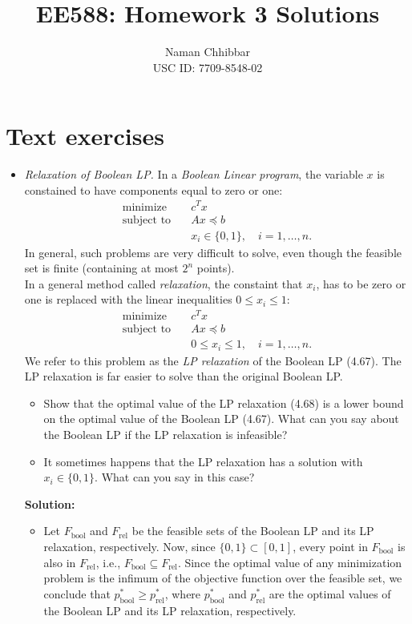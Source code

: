 \documentclass{article}
\title{EE588: Homework 3 Solutions}
\author{
  Naman Chhibbar \\
  USC ID: 7709-8548-02
}
\date{}
\begin{document}
\maketitle

\section{Text exercises}

\begin{itemize}
  \item[4.15] \textit{Relaxation of Boolean LP.} In a \textit{Boolean Linear program}, the variable $x$ is constained to have components equal to zero or one:
  \begin{align*}
    \text{minimize} \quad & c^T x \\
    \text{subject to} \quad & Ax \preceq b \tag{4.67} \\
    & x_i \in \{0, 1\}, \quad i = 1, \ldots, n.
  \end{align*}
  In general, such problems are very difficult to solve, even though the feasible set is finite (containing at most $2^n$ points). \\
  In a general method called \textit{relaxation}, the constaint that $x_i$, has to be zero or one is replaced with the linear inequalities $0 \le x_i \le 1$:
  \begin{align*}
    \text{minimize} \quad & c^T x \\
    \text{subject to} \quad & Ax \preceq b \tag{4.68} \\
    & 0 \le x_i \le 1, \quad i = 1, \ldots, n.
  \end{align*}
  We refer to this problem as the \textit{LP relaxation} of the Boolean LP (4.67). The LP relaxation is far easier to solve than the original Boolean LP.
  \begin{itemize}
    \item[(a)] Show that the optimal value of the LP relaxation (4.68) is a lower bound on the optimal value of the Boolean LP (4.67). What can you say about the Boolean LP if the LP relaxation is infeasible?
    \item[(b)] It sometimes happens that the LP relaxation has a solution with $x_i \in \{0, 1\}$. What can you say in this case?
  \end{itemize}
  \textbf{Solution:}
  \begin{itemize}
    \item[(a)] Let $F_{\text{bool}}$ and $F_{\text{rel}}$ be the feasible sets of the Boolean LP and its LP relaxation, respectively. Now, since $\{0, 1\} \subset [0, 1]$, every point in $F_{\text{bool}}$ is also in $F_{\text{rel}}$, i.e., $F_{\text{bool}} \subseteq F_{\text{rel}}$. Since the optimal value of any minimization problem is the infimum of the objective function over the feasible set, we conclude that $p^*_{\text{bool}} \ge p^*_{\text{rel}}$, where $p^*_{\text{bool}}$ and $p^*_{\text{rel}}$ are the optimal values of the Boolean LP and its LP relaxation, respectively. \\

\end{itemize}
\end{itemize}
\end{document}
